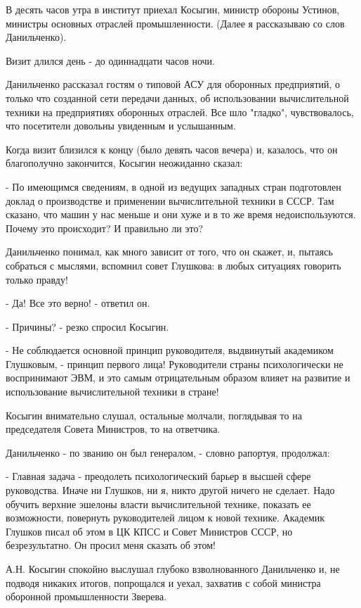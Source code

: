\documentclass{article}
\begin{document}
В десять часов утра в институт приехал Косыгин, министр обороны Устинов,
министры основных отраслей промышленности. (Далее я рассказываю со слов
Данильченко).

Визит длился день - до одиннадцати часов ночи.

Данильченко рассказал гостям о типовой АСУ для оборонных предприятий, о только
что созданной сети передачи данных, об использовании вычислительной техники на
предприятиях оборонных отраслей. Все шло "гладко", чувствовалось, что посетители
довольны увиденным и услышанным.

Когда визит близился к концу (было девять часов вечера) и, казалось, что он
благополучно закончится, Косыгин неожиданно сказал:

- По имеющимся сведениям, в одной из ведущих западных стран подготовлен доклад о
производстве и применении вычислительной техники в СССР. Там сказано, что машин
у нас меньше и они хуже и в то же время недоиспользуются. Почему это происходит?
И правильно ли это?

Данильченко понимал, как много зависит от того, что он скажет, и, пытаясь
собраться с мыслями, вспомнил совет Глушкова: в любых ситуациях говорить только
правду!

- Да! Все это верно! - ответил он.

- Причины? - резко спросил Косыгин.

- Не соблюдается основной принцип руководителя, выдвинутый академиком Глушковым,
- принцип первого лица! Руководители страны психологически не воспринимают ЭВМ,
и это самым отрицательным образом влияет на развитие и использование
вычислительной техники в стране!

Косыгин внимательно слушал, остальные молчали, поглядывая то на председателя
Совета Министров, то на ответчика.

Данильченко - по званию он был генералом, - словно рапортуя, продолжал:

- Главная задача - преодолеть психологический барьер в высшей сфере руководства.
Иначе ни Глушков, ни я, никто другой ничего не сделает. Надо обучить верхние
эшелоны власти вычислительной технике, показать ее возможности, повернуть
руководителей лицом к новой технике. Академик Глушков писал об этом в ЦК КПСС и
Совет Министров СССР, но безрезультатно. Он просил меня сказать об этом!

А.Н. Косыгин спокойно выслушал глубоко взволнованного Данильченко и, не подводя
никаких итогов, попрощался и уехал, захватив с собой министра оборонной
промышленности Зверева.
\end{document}
